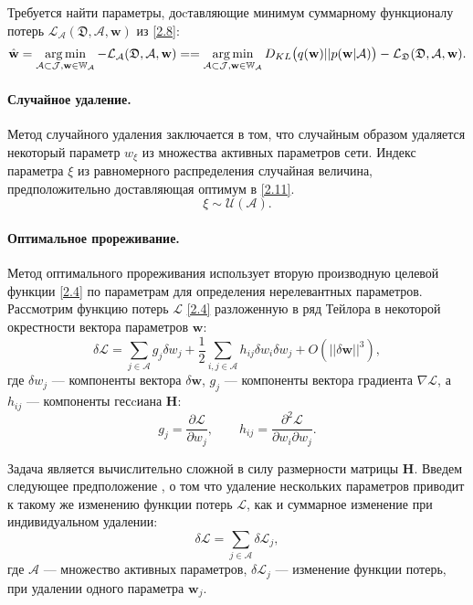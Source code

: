 Требуется найти параметры, доcтавляющие минимум суммарному функционалу потерь $\mathcal{L}_\mathcal{A}(\mathfrak{D},\mathcal{A},\textbf{w})$ из \eqref{2.8}:
\[
\label{2.11}
\begin{aligned}
\hat{\textbf{w}} = \operatorname*{arg\,min}_{\mathcal{A}\subset\mathcal{J}, \textbf{w} \in \mathbb{W_\mathcal{A}}} -\mathcal{L}_\mathcal{A}(\mathfrak{D}, \mathcal{A}, \textbf{w}) = 
=\operatorname*{arg\,min}_{\mathcal{A}\subset\mathcal{J}, \textbf{w} \in \mathbb{W_\mathcal{A}}} D_{KL}\bigl(q(\textbf{w})||p(\textbf{w}|\mathcal{A})\bigr) - \mathcal{L}_\mathfrak{D}(\mathfrak{D}, \mathcal{A}, \textbf{w}).
\end{aligned}
\]

\paragraph{Случайное удаление.}
Метод случайного удаления заключается в том, что случайным образом удаляется некоторый параметр $w_\xi$ из множества активных параметров сети.  Индекс параметра $\xi$ из равномерного распределения  случайная величина, предположительно доставляющая оптимум в \eqref{2.11}.
\[
\label{3.1.1}
\xi \sim \mathcal{U}(\mathcal{A}).
\]

\paragraph{Оптимальное прореживание.}
Метод оптимального прореживания \cite{cun1990} использует вторую производную целевой функции \eqref{2.4} по параметрам для определения нерелевантных параметров. Рассмотрим функцию потерь $\mathcal{L}$ \eqref{2.4} разложенную в ряд Тейлора в некоторой окрестности вектора параметров $\textbf{w}$:
\[
\label{3.2.1}
\delta \mathcal{L} = \sum_{j\in \mathcal{A}} g_j\delta w_j + \frac{1}{2}\sum_{i,j\in \mathcal{A}} h_{ij}\delta w_i\delta w_j + O(||\delta\textbf{w}||^3),
\]
где $\delta w_j $ --- компоненты вектора $\delta\textbf{w}$, $g_j$ --- компоненты вектора градиента $\nabla \mathcal{L}$, а $h_{ij}$ --- компоненты гесcиана $\textbf{H}$:
\[
\label{3.2.2}
g_j = \frac{\partial \mathcal{L}}{\partial w_j}, \qquad h_{ij} = \frac{\partial^2\mathcal{L}}{\partial w_i \partial w_j}.
\]

Задача является вычислительно сложной в силу размерности матрицы \textbf{H}. Введем следующее предположение \cite{cun1990}, о том что удаление нескольких параметров приводит к такому же изменению функции потерь $\mathcal{L}$, как и суммарное изменение при индивидуальном удалении:
\[
\label{3.2.3}
\delta \mathcal{L} = \sum_{j\in \mathcal{A}} \delta \mathcal{L}_j,
\]
где $\mathcal{A}$ --- множество активных параметров, $\delta\mathcal{L}_j$ --- изменение функции потерь, при удалении одного параметра $\textbf{w}_j$.

